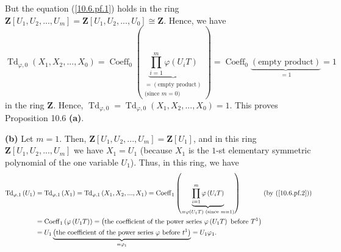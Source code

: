\documentclass[numbers=enddot,12pt,final,onecolumn,notitlepage]{scrartcl}%
\begin{document}
But the equation (\ref{10.6.pf.1}) holds in the ring $\mathbf{Z}\left[
U_{1},U_{2},...,U_{m}\right]  =\mathbf{Z}\left[  U_{1},U_{2},...,U_{0}\right]
\cong\mathbf{Z}$. Hence, we have%
\[
\operatorname*{Td}\nolimits_{\varphi,0}\left(  X_{1},X_{2},...,X_{0}\right)
=\operatorname*{Coeff}\nolimits_{0}\left(  \underbrace{\prod\limits_{i=1}%
^{m}\varphi\left(  U_{i}T\right)  }_{\substack{=\left(  \text{empty
product}\right)  \\\text{(since }m=0\text{)}}}\right)  =\operatorname*{Coeff}%
\nolimits_{0}\underbrace{\left(  \text{empty product}\right)  }_{=1}=1
\]
in the ring $\mathbf{Z}$. Hence, $\operatorname*{Td}\nolimits_{\varphi
,0}=\operatorname*{Td}\nolimits_{\varphi,0}\left(  X_{1},X_{2},...,X_{0}%
\right)  =1$. This proves Proposition 10.6 \textbf{(a)}.

\textbf{(b)} Let $m=1$. Then, $\mathbf{Z}\left[  U_{1},U_{2},...,U_{m}\right]
=\mathbf{Z}\left[  U_{1}\right]  $, and in this ring $\mathbf{Z}\left[
U_{1},U_{2},...,U_{m}\right]  $ we have $X_{1}=U_{1}$ (because $X_{1}$ is the
$1$-st elementary symmetric polynomial of the one variable $U_{1}$). Thus, in
this ring, we have%
\begin{align*}
\operatorname*{Td}\nolimits_{\varphi,1}\left(  U_{1}\right)   &
=\operatorname*{Td}\nolimits_{\varphi,1}\left(  X_{1}\right)
=\operatorname*{Td}\nolimits_{\varphi,1}\left(  X_{1},X_{2},...,X_{1}\right)
=\operatorname*{Coeff}\nolimits_{1}\left(  \underbrace{\prod\limits_{i=1}%
^{m}\varphi\left(  U_{i}T\right)  }_{=\varphi\left(  U_{1}T\right)  \text{
(since }m=1\text{)}}\right)  \ \ \ \ \ \ \ \ \ \ \left(  \text{by
(\ref{10.6.pf.2})}\right) \\
&  =\operatorname*{Coeff}\nolimits_{1}\left(  \varphi\left(  U_{1}T\right)
\right)  =\left(  \text{the coefficient of the power series }\varphi\left(
U_{1}T\right)  \text{ before }T^{1}\right) \\
&  =U_{1}\underbrace{\left(  \text{the coefficient of the power series
}\varphi\text{ before }t^{1}\right)  }_{=\varphi_{1}}=U_{1}\varphi_{1}.
\end{align*}
\end{document}
